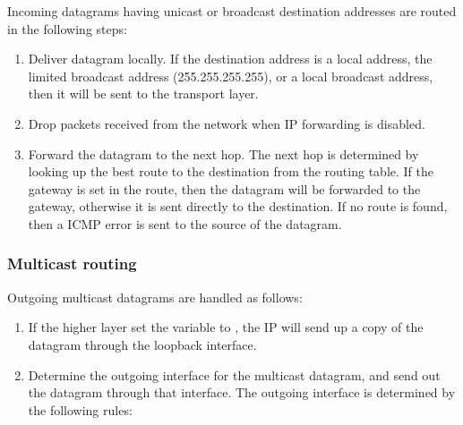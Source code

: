 Incoming datagrams having unicast or broadcast destination addresses are
routed in the following steps:

\begin{enumerate}
  \item Deliver datagram locally. If the destination address is a local
  address, the limited broadcast address (255.255.255.255), or a local
  broadcast address, then it will be sent to the transport layer.
  \item Drop packets received from the network when IP forwarding is disabled.
  \item Forward the datagram to the next hop. The next hop is
    determined by looking up the best route to the destination from the
    routing table. If the gateway is set in the route, then the datagram
    will be forwarded to the gateway, otherwise it is sent directly to the
    destination. If no route is found, then
    a  ICMP error is sent to the source of the
    datagram.
\end{enumerate}

\subsubsection*{Multicast routing}

Outgoing multicast datagrams are handled as follows:
\begin{enumerate}
  \item If the higher layer set the  variable
  to , the IP will send up a copy of the datagram
  through the loopback interface.
  \item Determine the outgoing interface for the multicast datagram,
  and send out the datagram through that interface. The outgoing
  interface is determined by the following rules:
\end{enumerate}



